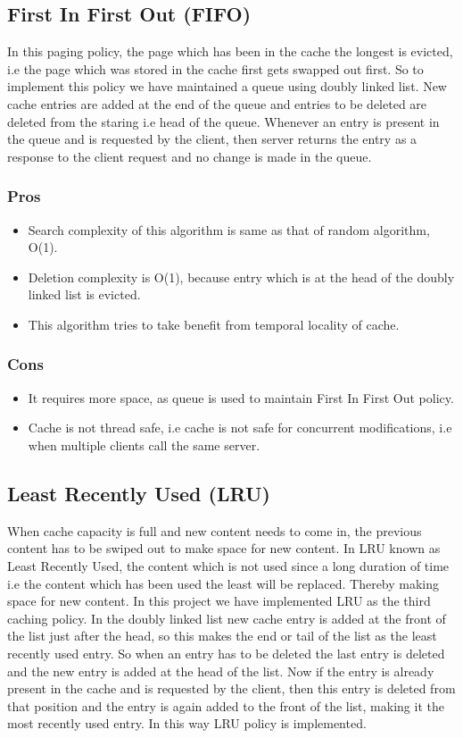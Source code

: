 \documentclass[11pt,pdftex,twocolumn]{article}
\begin{document}
\subsection{First In First Out (FIFO)}
In this paging policy, the page which has been in the cache the longest is evicted, i.e the page which was stored in the cache first gets swapped out first. So to implement this policy we have maintained a queue using doubly linked list. New cache entries are added at the end of the queue and entries to be deleted are deleted from the staring i.e head of the queue. Whenever an entry is present in the queue and is requested by the client, then server returns the entry as a response to the client request and no change is made in the queue.
\subsubsection{Pros}
\begin{itemize}
	\item Search complexity of this algorithm is same as that of random algorithm, O(1).
	\item Deletion complexity is O(1), because entry which is at the head of the doubly linked list is evicted.
	\item This algorithm tries to take benefit from temporal locality of cache.
\end{itemize}
\subsubsection{Cons}
\begin{itemize}
	\item It requires more space, as queue is used to maintain First In First Out policy.
	\item Cache is not thread safe, i.e cache is not safe for concurrent modifications, i.e when multiple clients call the same server.
\end{itemize}

\subsection{Least Recently Used (LRU)}
When cache capacity is full and new content needs to come in, the previous content has to be swiped out to make space for new content. In LRU known as Least Recently Used, the content which is not used since a long duration of time i.e the content which has been used the least will be replaced. Thereby making space for new content. In this project we have implemented LRU as the third caching policy. In the doubly linked list new cache entry is added at the front of the list just after the head, so this makes the end or tail of the list as the least recently used entry. So when an entry has to be deleted the last entry is deleted and the new entry is added at the head of the list. Now if the entry is already present in the cache and is requested by the client, then this entry is deleted from that position and the entry is again added to the front of the list, making it the most recently used entry. In this way LRU policy is implemented.
\end{document}

